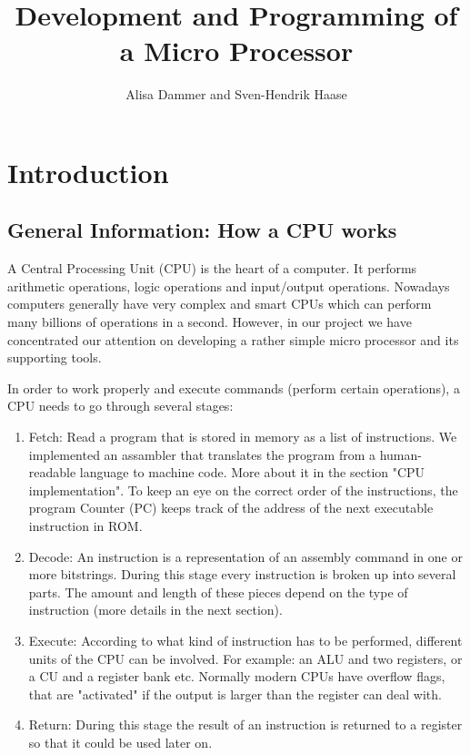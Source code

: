 \documentclass[12pt,a4paper]{scrartcl}
\begin{document}
\title{Development and Programming of a Micro Processor}
\author{Alisa Dammer and Sven-Hendrik Haase}
\maketitle

\tableofcontents

\newpage

\section{Introduction}
\subsection{General Information: How a CPU works}
A Central Processing Unit (CPU) is the heart of a computer. It performs arithmetic operations, logic operations and input/output operations. Nowadays computers generally have very complex and smart CPUs which can perform many billions of operations in a second. However, in our project we have concentrated our attention on developing a rather simple micro processor and its supporting tools.

In order to work properly and execute commands (perform certain operations), a CPU needs to go through several stages:
\begin{enumerate}
	\item Fetch: Read a program that is stored in memory as a list of instructions. We implemented an assambler that translates the program from a human-readable language to machine code. More about it in the section "CPU implementation". To keep an eye on the correct order of the instructions, the program Counter (PC) keeps track of the address of the next executable instruction in ROM.
	\item Decode: An instruction is a representation of an assembly command in one or more bitstrings. During this stage every instruction is broken up into several parts. The amount and length of these pieces depend on the type of instruction (more details in the next section). 
	\item Execute: According to what kind of instruction has to be performed, different units of the CPU can be involved. For example: an ALU and two registers, or a CU and a register bank etc. Normally modern CPUs have overflow flags, that are "activated" if the output is larger than the register can deal with.
	\item Return: During this stage the result of an instruction is returned to a register so that it could be used later on.
\end{enumerate}
\end{document}
